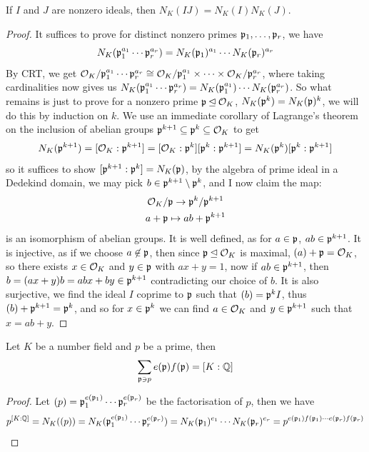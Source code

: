 \documentclass{article}
\begin{document}
\begin{proposition}
    If $I$ and $J$ are nonzero ideals, then $N_K(IJ)=N_K(I)N_K(J)$.\begin{proof}
        It suffices to prove for distinct nonzero primes $\mathfrak{p}_1,\ldots,\mathfrak{p}_r$, we have \[N_K(\mathfrak{p}_1^{a_1}\cdots\mathfrak{p}_r^{a_r})=N_K(\mathfrak{p}_1)^{a_1}\cdots N_K(\mathfrak{p}_r)^{a_r}\] By CRT, we get $\mathcal{O}_K/\mathfrak{p}_1^{a_1}\cdots\mathfrak{p}_r^{a_r}\cong \mathcal{O}_K/\mathfrak{p}_1^{a_1}\times\cdots\times\mathcal{O}_K/\mathfrak{p}_r^{a_r}$, where taking cardinalities now gives us $N_K(\mathfrak{p}_1^{a_1}\cdots\mathfrak{p}_r^{a_r})=N_K({\mathfrak{p}_1^{a_1}})\cdots N_K({\mathfrak{p}_r^{a_r}})$. So what remains is just to prove for a nonzero prime $\mathfrak{p}\unlhd \mathcal{O}_K$, $N_K({\mathfrak{p}^k})=N_K({\mathfrak{p}})^k$, we will do this by induction on $k$. We use an immediate corollary of Lagrange's theorem on the inclusion of abelian groups $\mathfrak{p}^{k+1}\subseteq \mathfrak{p}^k\subseteq \mathcal{O}_K$ to get \[
        N_K({\mathfrak{p}^{k+1}})=[\mathcal{O}_K:\mathfrak{p}^{k+1}] = [\mathcal{O}_K:\mathfrak{p}^k][\mathfrak{p}^k:\mathfrak{p}^{k+1}] = N_K({\mathfrak{p}^k})[\mathfrak{p}^k:\mathfrak{p}^{k+1}]
        \] so it suffices to show $[\mathfrak{p}^{k+1}:\mathfrak{p}^k]=N_K({\mathfrak{p}})$, by the algebra of prime ideal in a Dedekind domain, we may pick $b\in\mathfrak{p}^{k+1}\setminus\mathfrak{p}^k$, and I now claim the map: \begin{gather*}
            \mathcal{O}_K/\mathfrak{p} \rightarrow \mathfrak{p}^k/\mathfrak{p}^{k+1}\\
            a + \mathfrak{p} \mapsto ab + \mathfrak{p}^{k+1}
        \end{gather*} is an isomorphism of abelian groups. It is well defined, as for $a\in\mathfrak{p}$, $ab\in\mathfrak{p}^{k+1}$. It is injective, as if we choose $a\not\in\mathfrak{p}$, then since $\mathfrak{p}\unlhd\mathcal{O}_K$ is maximal, $(a)+\mathfrak{p}=\mathcal{O}_K$, so there exists $x\in\mathcal{O}_K$ and $y\in\mathfrak{p}$ with $ax+y=1$, now if $ab\in\mathfrak{p}^{k+1}$, then $b=(ax+y)b = abx + by\in\mathfrak{p}^{k+1}$ contradicting our choice of $b$. It is also surjective, we find the ideal $I$ coprime to $\mathfrak{p}$ such that $(b)=\mathfrak{p}^kI$, thus $(b)+\mathfrak{p}^{k+1}=\mathfrak{p}^k$, and so for $x\in\mathfrak{p}^k$ we can find $a\in\mathcal{O}_K$ and $y\in\mathfrak{p}^{k+1}$ such that $x=ab+y$.
    \end{proof}
\end{proposition}

\begin{theorem}
    Let $K$ be a number field and $p$ be a prime, then \[
    \sum_{\mathfrak{p}\ni p}e(\mathfrak{p})f(\mathfrak{p})=[K:\mathbb{Q}]
    \]\begin{proof}
        Let $(p)=\mathfrak{p}_1^{e(\mathfrak{p}_1)}\cdots \mathfrak{p}_r^{e(\mathfrak{p}_r)}$ be the factorisation of $p$, then we have \[
        p^{[K:\mathbb{Q}]} = N_K((p)) = N_K(\mathfrak{p}_1^{e(\mathfrak{p}_1)}\cdots \mathfrak{p}_r^{e(\mathfrak{p}_r)}) = N_K(\mathfrak{p}_1)^{e_1}\cdots N_K(\mathfrak{p}_r)^{e_r} = p^{e(\mathfrak{p}_1)f(\mathfrak{p}_1)\cdots e(\mathfrak{p}_r)f(\mathfrak{p}_r)}\qedhere
        \]
    \end{proof}
\end{theorem}
\end{document}
